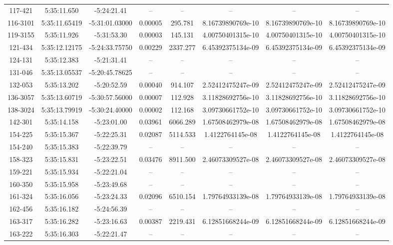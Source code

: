 \begin{table}
\begin{tabular}{cccccccc}
117-421 & 5:35:11.650 & -5:24:21.41 & -- & -- & -- & -- & -- \\
116-3101 & 5:35:11.65419 & -5:31:01.03000 & 0.00005 & 295.781 & 8.16739890769e-10 & 8.16739890769e-10 & 8.16739890769e-10 \\
119-3155 & 5:35:11.926 & -5:31:53.30 & 0.00003 & 145.131 & 4.00750401315e-10 & 4.00750401315e-10 & 4.00750401315e-10 \\
121-434 & 5:35:12.12175 & -5:24:33.75750 & 0.00229 & 2337.277 & 6.45392375134e-09 & 6.45392375134e-09 & 6.45392375134e-09 \\
124-131 & 5:35:12.383 & -5:21:31.41 & -- & -- & -- & -- & -- \\
131-046 & 5:35:13.05537 & -5:20:45.78625 & -- & -- & -- & -- & -- \\
132-053 & 5:35:13.202 & -5:20:52.59 & 0.00040 & 914.107 & 2.52412475247e-09 & 2.52412475247e-09 & 2.52412475247e-09 \\
136-3057 & 5:35:13.60719 & -5:30:57.56000 & 0.00007 & 112.928 & 3.11828692756e-10 & 3.11828692756e-10 & 3.11828692756e-10 \\
138-3024 & 5:35:13.79919 & -5:30:24.40000 & 0.00002 & 112.168 & 3.09730661752e-10 & 3.09730661752e-10 & 3.09730661752e-10 \\
142-301 & 5:35:14.158 & -5:23:01.00 & 0.03961 & 6066.289 & 1.67508462979e-08 & 1.67508462979e-08 & 1.67508462979e-08 \\
154-225 & 5:35:15.367 & -5:22:25.31 & 0.02087 & 5114.533 & 1.4122764145e-08 & 1.4122764145e-08 & 1.4122764145e-08 \\
154-240 & 5:35:15.383 & -5:22:39.79 & -- & -- & -- & -- & -- \\
158-323 & 5:35:15.831 & -5:23:22.51 & 0.03476 & 8911.500 & 2.46073309527e-08 & 2.46073309527e-08 & 2.46073309527e-08 \\
159-221 & 5:35:15.934 & -5:22:21.04 & -- & -- & -- & -- & -- \\
160-350 & 5:35:15.958 & -5:23:49.68 & -- & -- & -- & -- & -- \\
161-324 & 5:35:16.056 & -5:23:24.33 & 0.02096 & 6510.154 & 1.79764933139e-08 & 1.79764933139e-08 & 1.79764933139e-08 \\
162-456 & 5:35:16.182 & -5:24:56.39 & -- & -- & -- & -- & -- \\
163-317 & 5:35:16.282 & -5:23:16.63 & 0.00387 & 2219.431 & 6.12851668244e-09 & 6.12851668244e-09 & 6.12851668244e-09 \\
163-222 & 5:35:16.303 & -5:22:21.47 & -- & -- & -- & -- & -- \\

\end{tabular}
\end{table}
